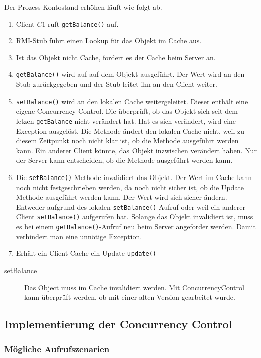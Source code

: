 Der Prozess Kontostand erhöhen läuft wie folgt ab.

\begin{enumerate}
\item Client $C1$ ruft \verb+getBalance()+ auf.
\item RMI-Stub führt einen Lookup für das Objekt im Cache aus.
\item Ist das Objekt nicht Cache, fordert es der Cache beim Server an.
\item \verb+getBalance()+ wird auf auf dem Objekt ausgeführt. Der Wert wird an den Stub zurückgegeben und der Stub leitet ihn an den Client weiter.
\item \verb+setBalance()+ wird an den lokalen Cache weitergeleitet. Dieser enthält eine eigene Concurrency Control. Die überprüft, ob das Objekt sich seit dem letzen \verb+getBalance+ nicht verändert hat. Hat es sich verändert, wird eine Exception ausgelöst. Die Methode ändert den lokalen Cache nicht, weil zu diesem Zeitpunkt noch nicht klar ist, ob die Methode ausgeführt werden kann. Ein anderer Client könnte, das Objekt inzwischen verändert haben. Nur der Server kann entscheiden, ob die Methode ausgeführt werden kann.
\item Die \verb+setBalance()+-Methode invalidiert das Objekt. Der Wert im Cache kann noch nicht festgeschrieben werden, da noch nicht sicher ist, ob die Update Methode ausgeführt werden kann. Der Wert wird sich sicher ändern. Entweder aufgrund des lokalen \verb+setBalance()+-Aufruf oder weil ein anderer Client \verb+setBalance()+ aufgerufen hat. Solange das Objekt invalidiert ist, muss es bei einem \verb+getBalance()+-Aufruf neu beim Server angeforder werden. Damit verhindert man eine unnötige Exception.
\item Erhält ein Client Cache ein Update \verb+update()+
\end{enumerate}

\begin{description}
\item [setBalance] Das Object muss im Cache invalidiert werden. Mit ConcurrencyControl kann überprüft werden, ob mit einer alten Version gearbeitet wurde.
\end{description}

\subsection{Implementierung der Concurrency Control}
\label{sec:impl-der-conc}

\subsubsection{Mögliche Aufrufszenarien}
\label{sec:mogl-aufr}


